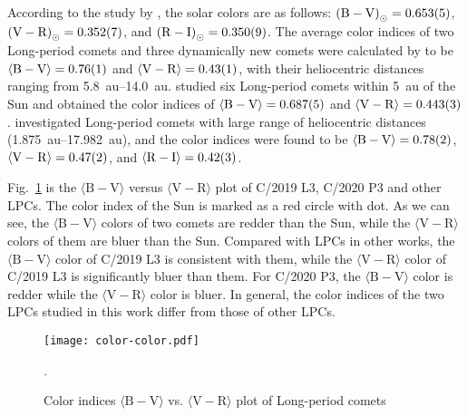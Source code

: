 According to the study by \cite{ramirez_ubvric_2012}, the solar colors are as follows: 
${(\mathrm{B} - \mathrm{V})}_{\odot} = \num{0.653 +- 0.005}$, 
${(\mathrm{V} - \mathrm{R})}_{\odot} = \num{0.352 +- 0.007}$, and 
${(\mathrm{R} - \mathrm{I})}_{\odot} = \num{0.350 +- 0.009}$. 
The average color indices of two Long-period comets and three dynamically new comets were calculated by \cite{meech_activity_2009} to be 
$\langle \mathrm{B} - \mathrm{V} \rangle = \num{0.76 +- 0.01}$ and 
$\langle \mathrm{V} - \mathrm{R} \rangle = \num{0.43 +- 0.01}$, 
with their heliocentric distances ranging from \SIrange{5.8}{14.0}{\astronomicalunit}. 
\cite{solontoi_ensemble_2012} studied six Long-period comets within \SI{5}{\astronomicalunit} of the Sun and obtained the color indices of 
$\langle \mathrm{B} - \mathrm{V} \rangle = \num{0.687 +- 0.005}$ and 
$\langle \mathrm{V} - \mathrm{R} \rangle = \num{0.443 +- 0.003}$. 
\cite{jewittCOLORSYSTEMATICSCOMETS2015} investigated Long-period comets with large range of heliocentric distances (\SIrange{1.875}{17.982}{\astronomicalunit}), and the color indices were found to be 
$\langle \mathrm{B} - \mathrm{V} \rangle = \num{0.78 +- 0.02}$, 
$\langle \mathrm{V} - \mathrm{R} \rangle = \num{0.47 +- 0.02}$, and 
$\langle \mathrm{R} - \mathrm{I} \rangle = \num{0.42 +- 0.03}$. 


Fig.~\ref{fig:color-color} is the $\langle \mathrm{B}-\mathrm{V} \rangle$ versus $\langle \mathrm{V}-\mathrm{R} \rangle$ plot of C/2019 L3, C/2020 P3 and other LPCs. 
The color index of the Sun \citep{ramirez_ubvric_2012} is marked as a red circle with dot. 
As we can see, the $\langle \mathrm{B} - \mathrm{V} \rangle$ colors of two comets are redder than the Sun, while the $\langle \mathrm{V} - \mathrm{R} \rangle$ colors of them are bluer than the Sun. 
Compared with LPCs in other works, the $\langle \mathrm{B} - \mathrm{V} \rangle$ color of C/2019 L3 is consistent with them, while the $\langle \mathrm{V} - \mathrm{R} \rangle$ color of C/2019 L3 is significantly bluer than them. For C/2020 P3, the $\langle \mathrm{B} - \mathrm{V} \rangle$ color is redder while the $\langle \mathrm{V} - \mathrm{R} \rangle$ color is bluer. 
In general, the color indices of the two LPCs studied in this work differ from those of other LPCs. 



\begin{figure}
    \centering
    \texttt{[image: color-color.pdf]}
    \caption{Color indices $\langle \mathrm{B-V} \rangle$ vs. $\langle \mathrm{V-R} \rangle$ plot of Long-period comets}.\label{fig:color-color}
\end{figure}

